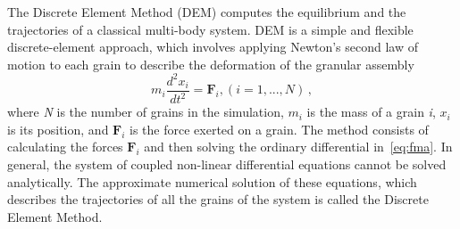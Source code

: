 The Discrete Element Method (DEM) computes the equilibrium and the trajectories 
of a classical multi-body system. DEM is a simple and 
flexible discrete-element approach, which involves applying Newton's second law 
of motion to each grain to describe the deformation of the granular assembly 
% 
\begin{equation} 
{m}_{i}\frac{{{d}^{2}}{{x}_{i}}}{d{{t}^{2}}} = {{\mathbf{F}}_{i}}, 
(i=1,...,N ) \,,
\label{eq:fma}
\end{equation}
%
where \textit{N} is the number of grains in the simulation, $m_{\mathit{i}}$ 
is the mass of a grain \textit{i}, $x_{\mathit{i}}$ is its position, and 
$\mathbf{F}_{\mathit{i}}$ is the force exerted on a grain. The method consists 
of 
calculating the forces $\mathbf{F}_{\mathit{i}}$ and then solving 
the ordinary differential in~\cref{eq:fma}. In general, the system of coupled 
non-linear differential equations cannot be solved analytically. The 
approximate numerical solution of these equations, which describes the 
trajectories of all the grains of the system is called the Discrete Element 
Method.

